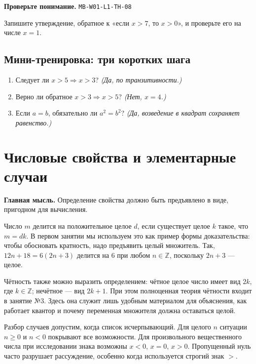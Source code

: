 \documentclass[11pt,a4paper,openany]{book}
\newcommand{\muid}[1]{\texttt{\footnotesize #1}}
\begin{document}
\begin{learnbox}\textbf{Проверьте понимание.} \muid{MB-W01-L1-TH-08}\par Запишите утверждение, обратное к «если $x>7$, то $x>0$», и проверьте его на числе $x=1$.\end{learnbox}

\subsection*{Мини-тренировка: три коротких шага}
\begin{enumerate}[label=\arabic*),leftmargin=*,itemsep=3pt]

\item Следует ли $x>5\Rightarrow x>3$? \textit{(Да, по транзитивности.)}

\item Верно ли обратное $x>3\Rightarrow x>5$? \textit{(Нет, $x=4$.)}

\item Если $a=b$, обязательно ли $a^2=b^2$? \textit{(Да, возведение в квадрат сохраняет равенство.)}

\end{enumerate}

\medskip

\section{Числовые свойства и элементарные случаи}\label{theory:9}

\begin{keybox}\textbf{Главная мысль.} Определение свойства должно быть предъявлено в виде, пригодном для вычисления.\end{keybox}

Число $m$ делится на положительное целое $d$, если существует целое $k$ такое, что $m=dk$. В первом занятии мы используем это как пример формы доказательства: чтобы обосновать кратность, надо предъявить целый множитель. Так, $12n+18=6(2n+3)$ делится на $6$ при любом $n\in\mathbb Z$, поскольку $2n+3$ — целое.


Чётность также можно выразить определением: чётное целое число имеет вид $2k$, где $k\in\mathbb Z$; нечётное — вид $2k+1$. При этом полноценная теория чётности входит в занятие №3. Здесь она служит лишь удобным материалом для объяснения, как работает квантор и почему переменная множителя должна оставаться целой.


Разбор случаев допустим, когда список исчерпывающий. Для целого $n$ ситуации $n\ge0$ и $n<0$ покрывают все возможности. Для произвольного вещественного числа при исследовании знака возможны $x<0$, $x=0$, $x>0$. Пропущенный нуль часто разрушает рассуждение, особенно когда используется строгий знак $>$.
\end{document}

